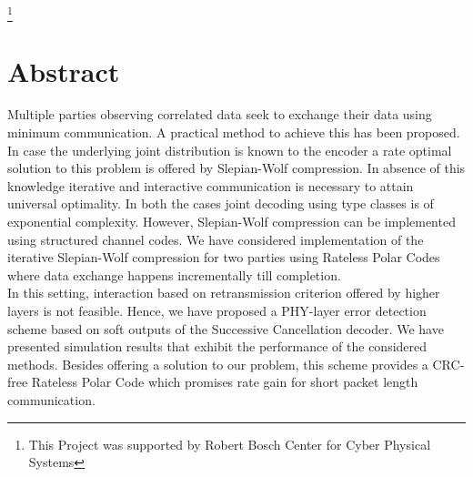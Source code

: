 \documentclass[
11pt, %
a4paper, %
oneside, %
headinclude,footinclude, %
BCOR5mm, %
]{scrartcl}
\begin{document}
\pagestyle{scrheadings} %


\newpage
\maketitle %


\setcounter{tocdepth}{2} %

\tableofcontents %
\listoffigures
\footnote{This Project was supported by Robert Bosch Center for Cyber Physical Systems}
\newpage
\section{Abstract}
Multiple parties observing correlated data seek to exchange their data using minimum communication. A practical method to achieve this has been proposed. \\In case the underlying joint distribution is known to the encoder a rate optimal solution to this problem is offered by Slepian-Wolf compression. In absence of this knowledge iterative and interactive communication is necessary to attain universal optimality. In both the cases joint decoding using type classes is of exponential complexity. However, Slepian-Wolf compression can be implemented using structured channel codes. We have considered implementation of the iterative Slepian-Wolf compression for two parties using Rateless Polar Codes where data exchange happens incrementally till completion. \\In this setting, interaction based on retransmission criterion offered by higher layers is not feasible.
Hence, we have  proposed a PHY-layer error detection scheme based on soft outputs of the Successive Cancellation decoder. We have presented simulation results that exhibit the performance of the considered methods.
Besides offering a solution to our problem, this scheme provides a CRC-free Rateless Polar Code which promises rate gain for short packet length communication.
 
\end{document}
